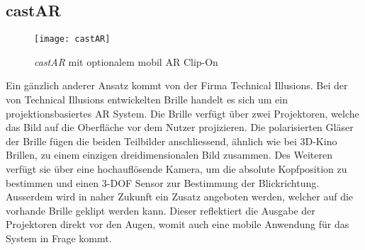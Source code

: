 \subsection*{castAR}
\begin{wrapfigure}{r}{0.4\textwidth}
	\vspace{-30pt}
	\begin{center}
		\texttt{[image: castAR]}
	\end{center}
	\vspace{-15pt}
	\captionsetup{width=0.32\textwidth}
	\caption{\textit{castAR} mit optionalem mobil AR Clip-On}\label{castAR}
	\vspace{-15pt}
\end{wrapfigure}
Ein gänzlich anderer Ansatz kommt von der Firma Technical Illusions. Bei der von Technical Illusions entwickelten Brille handelt es sich um ein projektionsbasiertes AR System. Die Brille verfügt über zwei Projektoren, welche das Bild auf die Oberfläche vor dem Nutzer projizieren. Die polarisierten Gläser der Brille fügen die beiden Teilbilder anschliessend, ähnlich wie bei 3D-Kino Brillen, zu einem einzigen dreidimensionalen Bild zusammen. Des Weiteren verfügt sie über eine hochauflösende Kamera, um die absolute Kopfposition zu bestimmen und einen 3-DOF Sensor zur Bestimmung der Blickrichtung. Ausserdem wird in naher Zukunft ein Zusatz angeboten werden, welcher auf die vorhande Brille geklipt werden kann. Dieser reflektiert die Ausgabe der Projektoren direkt vor den Augen, womit auch eine mobile Anwendung für das System in Frage kommt.\cite{website:castAR}
\vspace{-12pt}
